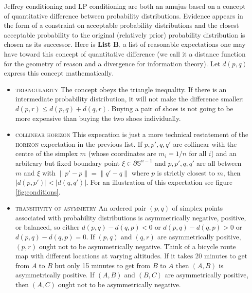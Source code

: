 \documentclass[smallextended]{svjour3}       %
\begin{document}
Jeffrey conditioning and LP conditioning are both an amujus based on a
concept of quantitative difference between probability distributions.
Evidence appears in the form of a constraint on acceptable probability
distributions and the closest acceptable probability to the original
(relatively prior) probability distribution is chosen as its
successor. Here is \textbf{List B}\label{page:listtwo}, a list of
reasonable expectations one may have toward this concept of
quantitative difference (we call it a distance function for the
geometry of reason and a divergence for information theory). Let
$d(p,q)$ express this concept mathematically.

\begin{itemize}
\item \textsc{triangularity} The concept obeys the triangle
  inequality. If there is an intermediate probability distribution, it
  will not make the difference smaller: $d(p,r)\leq{}d(p,q)+d(q,r)$.
  Buying a pair of shoes is not going to be more expensive than buying
  the two shoes individually.
\item \textsc{collinear horizon} This expecation is just a more
  technical restatement of the \textsc{horizon} expectation in the
  previous list. If $p,p',q,q'$ are collinear with the centre of the
  simplex $m$ (whose coordinates are $m_{i}=1/n$ for all $i$) and an
  arbitrary but fixed boundary point $\xi\in\partial\mathbb{S}^{n-1}$
  and $p,p',q,q'$ are all between $m$ and $\xi$ with
  $\|p'-p\|=\|q'-q\|$ where $p$ is strictly closest to $m$, then
  $|d(p,p')|<|d(q,q')|$. For an illustration of this expectation see
  figure \ref{fig:conditions}. 
\item \textsc{transitivity of asymmetry} An ordered pair $(p,q)$ of
  simplex points associated with probability distributions is
  asymmetrically negative, positive, or balanced, so either
  $d(p,q)-d(q,p)<0$ or $d(p,q)-d(q,p)>0$ or $d(p,q)-d(q,p)=0$. If
  $(p,q)$ and $(q,r)$ are asymmetrically positive, $(p,r)$ ought not
  to be asymmetrically negative. Think of a bicycle route map with
  different locations at varying altitudes. If it takes 20 minutes to
  get from $A$ to $B$ but only 15 minutes to get from $B$ to $A$ then
  $(A,B)$ is asymmetrically positive. If $(A,B)$ and $(B,C)$ are
  asymmetrically positive, then $(A,C)$ ought not to be asymmetrically
  negative.
\end{itemize}
\end{document}

